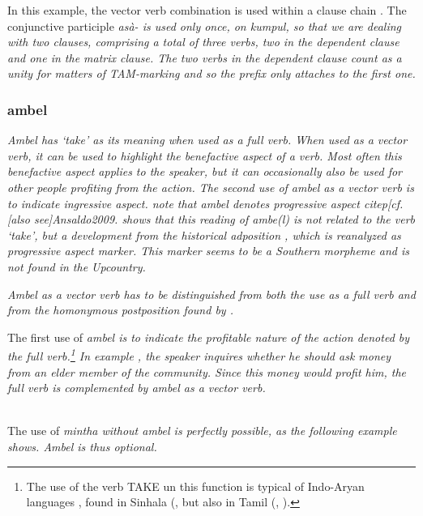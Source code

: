 In this example, the vector verb combination  is used within a clause chain . The conjunctive participle \em asà- \em  is used only once, on \em kumpul\em, so that we are dealing with two clauses, comprising a total of three verbs, two in the dependent clause and one in the matrix clause. The two verbs in the dependent clause count as a unity for matters of TAM-marking and so the prefix only attaches to the first one.



\subsubsection{ambel}\label{sec:wc:ambel}
\em Ambel \em has `take' as its meaning when used as a full verb. When used as a vector verb,  it can be used to highlight the benefactive aspect of a verb. Most often this benefactive aspect applies to the speaker, but it can occasionally also be used for other people profiting from the action. The second use of \em ambel \em as a vector verb is to indicate ingressive aspect.   \citep{SmithEtAl2004} note that \em ambel \em denotes progressive aspect  citep[cf.[also see]{Ansaldo2009}. \citet{Slomanson2008ismil} shows that this reading of \em ambe(l) \em is not related to the verb `take', but a development from  the historical adposition , which is reanalyzed as progressive aspect marker. This marker  seems to be a Southern morpheme and is not found in the Upcountry.

\em Ambel \em as a vector verb has to be distinguished from both the use as a full verb and from the homonymous postposition found by \citet{Slomanson2008ismil}.

The first use of \em ambel \em is to indicate the profitable nature of the action denoted by the full verb.\footnote{The use of the verb TAKE un this function is typical of Indo-Aryan languages \citep[175]{AbbiEtAl1991EVC},   found in Sinhala (\citet[44]{Jayawardena2004}\citet[81]{Matzel1983}, but also in Tamil (\citet[193]{Arden1934}, \citet[95]{Schiffman1999}).} In example , the speaker inquires whether he should ask money from an elder member of the community. Since this money would profit him, the full verb  is complemented by \em ambel \em as a vector verb.


 \\
The use of \em mintha \em without \em ambel \em is perfectly possible, as the following example shows. \em Ambel \em is thus optional.


